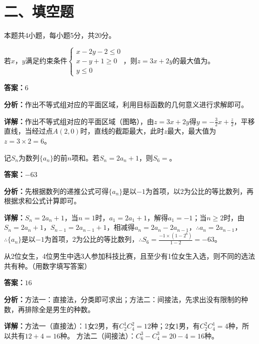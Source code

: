 \section*{二、填空题}
本题共4小题，每小题5分，共20分。

\begin{question}[points=5]
若$x$，$y$满足约束条件$\begin{cases} x-2y-2\leq0 \\ x-y+1\geq0 \\ y\leq0 \end{cases}$，则$z=3x+2y$的最大值为。
\fillin[{$6$}]
\begin{solution}
\textbf{答案：}$6$

\textbf{分析：}作出不等式组对应的平面区域，利用目标函数的几何意义进行求解即可。

\textbf{详解：}作出不等式组对应的平面区域（图略），由$z=3x+2y$得$y=-\frac{3}{2}x+\frac{z}{2}$，平移直线，当经过点$A(2,0)$时，直线的截距最大，此时$z$最大，最大值为$z=3\times2=6$。
\end{solution}
\end{question}

\begin{question}[points=5]
记$S_n$为数列$\{a_n\}$的前$n$项和。若$S_n=2a_n+1$，则$S_6=$。
\fillin[{$-63$}]
\begin{solution}
\textbf{答案：}$-63$

\textbf{分析：}先根据数列的递推公式可得$\{a_n\}$是以$-1$为首项，以$2$为公比的等比数列，再根据求和公式计算即可。

\textbf{详解：}$S_n=2a_n+1$，当$n=1$时，$a_1=2a_1+1$，解得$a_1=-1$；当$n\geq2$时，由$S_n=2a_n+1$，$S_{n-1}=2a_{n-1}+1$，相减得$a_n=2a_n-2a_{n-1}$，$\therefore a_n=2a_{n-1}$，$\therefore \{a_n\}$是以$-1$为首项，$2$为公比的等比数列，$\therefore S_6=\frac{-1\times(1-2^6)}{1-2}=-63$。
\end{solution}
\end{question}

\begin{question}[points=5]
从2位女生，4位男生中选3人参加科技比赛，且至少有1位女生入选，则不同的选法共有种。（用数字填写答案）
\fillin[{$16$}]
\begin{solution}
\textbf{答案：}$16$

\textbf{分析：}方法一：直接法，分类即可求出；方法二：间接法，先求出没有限制的种数，再排除全是男生的种数。

\textbf{详解：}方法一（直接法）：1女2男，有$C_2^1C_4^2=12$种；2女1男，有$C_2^2C_4^1=4$种，所以共有$12+4=16$种。
方法二（间接法）：$C_6^3-C_4^3=20-4=16$种。
\end{solution}
\end{question}

